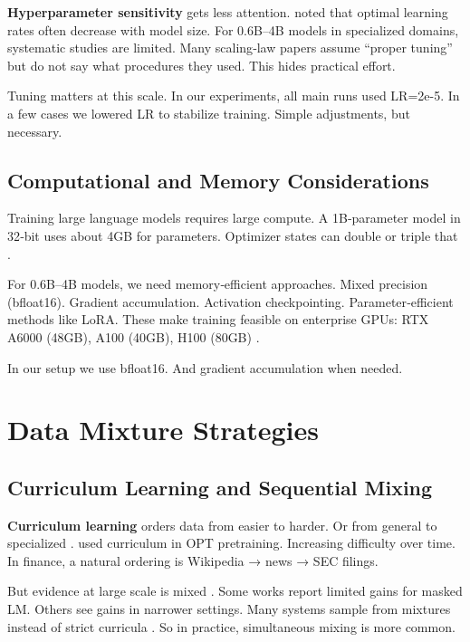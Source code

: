 \textbf{Hyperparameter sensitivity} gets less attention. \textcite{mccandlish2018empirical} noted that optimal learning rates often decrease with model size. For 0.6B--4B models in specialized domains, systematic studies are limited. Many scaling‑law papers assume ``proper tuning'' but do not say what procedures they used. This hides practical effort.

Tuning matters at this scale. In our experiments, all main runs used LR=2e-5. In a few cases we lowered LR to stabilize training. Simple adjustments, but necessary.

\subsection{Computational and Memory Considerations}

Training large language models requires large compute. A 1B‑parameter model in 32‑bit uses about 4GB for parameters. Optimizer states can double or triple that \parencite{rajbhandari2020zero,kingma2014adam}.

For 0.6B--4B models, we need memory‑efficient approaches. Mixed precision (bfloat16). Gradient accumulation. Activation checkpointing. Parameter‑efficient methods like LoRA. These make training feasible on enterprise GPUs: RTX A6000 (48GB), A100 (40GB), H100 (80GB) \parencite{narayanan2021efficient,hu2021lora}.

In our setup we use bfloat16. And gradient accumulation when needed.

\section{Data Mixture Strategies}

\subsection{Curriculum Learning and Sequential Mixing}

\textbf{Curriculum learning} orders data from easier to harder. Or from general to specialized \parencite{bengio2009curriculum}. \textcite{wu2022opt} used curriculum in OPT pretraining. Increasing difficulty over time. In finance, a natural ordering is Wikipedia → news → SEC filings.

But evidence at large scale is mixed \parencite{longpre2023pretrainer}. Some works report limited gains for masked LM. Others see gains in narrower settings. Many systems sample from mixtures instead of strict curricula \parencite{raffel2020exploring,wu2022opt}. So in practice, simultaneous mixing is more common.

